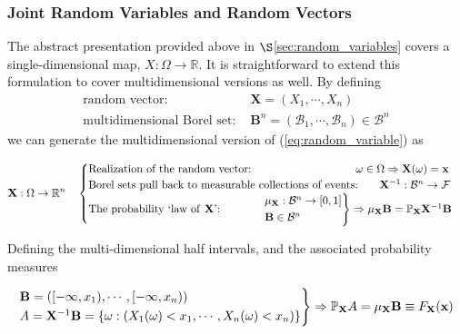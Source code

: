 \documentclass[12pt, twoside, draft]{article}
\begin{document}
\subsubsection{Joint Random Variables and Random Vectors}\label{sec:joint_random_variables}
The abstract presentation provided above in $\S$\ref{sec:random_variables} covers a single-dimensional map, $X:\Omega \rightarrow \mathbb{R}$.  It is straightforward to extend this formulation to cover multidimensional versions as well. By defining 
\begin{align}
\text{random vector: } & \mathbf{X} = \left(X_1, \cdots, X_n \right) \\
\text{multidimensional Borel set: } & \mathbf{B}^n = (\mathcal{B}_1, \cdots, \mathcal{B}_n) \in \mathcal{B}^n
\end{align}
we can generate the multidimensional version of (\ref{eq:random_variable}) as

\begin{equation}\label{eq:random_vector}
\mathbf{X}:\Omega \rightarrow \mathbb{R}^n \hspace{10pt}
\begin{cases}
\text{Realization of the random vector: }\hspace{90pt} \omega \in \Omega \Rightarrow \mathbf{X}(\omega) = \mathbf{x} \\
\text{Borel sets pull back to measurable collections of events: }  \hspace{15pt} \mathbf{X}^{-1}: \mathcal{B}^n \rightarrow \mathcal{F} \\
\text{The probability `law of \textbf{X}': } \hspace{34pt} 
\begin{rcases}
\mu_{\mathbf{X}} : \mathcal{B}^n \rightarrow [0,1] \\
\mathbf{B} \in \mathcal{B}^n 
\end{rcases} \Rightarrow \mu_\mathbf{X} \mathbf{B} = \mathbb{P}_\mathbf{X} \mathbf{X}^{-1} \mathbf{B}
\end{cases}
\end{equation}

Defining the multi-dimensional half intervals, and the associated probability measures

\begin{equation}
\begin{rcases}
\mathbf{B} = ([-\infty, x_1), \cdots, [-\infty, x_n)) \\
A = \mathbf{X}^{-1}\mathbf{B} = \{\omega: (X_1(\omega) < x_1, \cdots, X_n(\omega) < x_n) \} \\
\end{rcases} \Rightarrow
\mathbb{P}_{\mathbf{X}} A = \mu_{\mathbf{X}} \mathbf{B} \equiv F_{\mathbf{X}}(\mathbf{x})
\end{equation}
\end{document}
